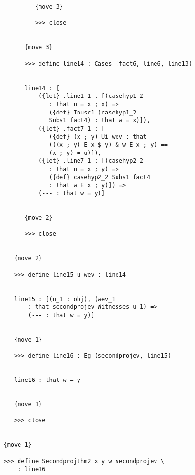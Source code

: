 \documentclass[12pt]{article}
\begin{document}
\begin{verbatim}
            {move 3}

            >>> close


         {move 3}

         >>> define line14 : Cases (fact6, line6, line13)


         line14 : [
             ({let} .line1_1 : [(casehyp1_2 
                : that u = x ; x) => 
                ({def} Inusc1 (casehyp1_2 
                Subs1 fact4) : that w = x)]), 
             ({let} .fact7_1 : [
                ({def} (x ; y) Ui wev : that 
                (((x ; y) E x $ y) & w E x ; y) == 
                (x ; y) = u)]), 
             ({let} .line7_1 : [(casehyp2_2 
                : that u = x ; y) => 
                ({def} casehyp2_2 Subs1 fact4 
                : that w E x ; y)]) => 
             (--- : that w = y)]


         {move 2}

         >>> close


      {move 2}

      >>> define line15 u wev : line14


      line15 : [(u_1 : obj), (wev_1 
          : that secondprojev Witnesses u_1) => 
          (--- : that w = y)]


      {move 1}

      >>> define line16 : Eg (secondprojev, line15)


      line16 : that w = y


      {move 1}

      >>> close


   {move 1}

   >>> define Secondprojthm2 x y w secondprojev \
       : line16



\end{verbatim}
\end{document}
